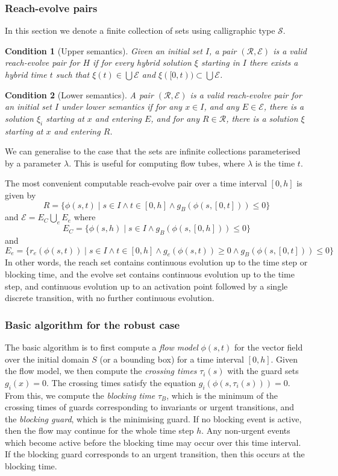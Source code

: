 \documentclass[english,a4paper]{article}
\theoremstyle{theorem}
\newtheorem*{condition*}{Condition}
\theoremstyle{definition}
\theoremstyle{remark}
\begin{document}
\subsubsection*{Reach-evolve pairs}

In this section we denote a finite collection of sets using calligraphic type $\mathcal{S}$.
\begin{condition*}[Upper semantics]
Given an initial set $I$, a pair $(\mathcal{R},\mathcal{E})$ is a valid reach-evolve pair for $H$ if for every hybrid solution $\xi$ starting in $I$ there exists a hybrid time $t$ such that $\xi(t)\in \bigcup\mathcal{E}$ and $\xi([0,t))\subset \bigcup\mathcal{E}$.
\end{condition*}

\begin{condition*}[Lower semantics]
A pair $(\mathcal{R},\mathcal{E})$ is a valid reach-evolve pair for an initial set $I$ under \emph{lower semantics} if for any $x\in I$, and any $E\in\mathcal{E}$, there is a solution $\xi_i$ starting at $x$ and entering $E$, and for any $R\in\mathcal{R}$, there is a solution $\xi$ starting at $x$ and entering $R$.
\end{condition*}
We can generalise to the case that the sets are infinite collections parameterised by a parameter $\lambda$. This is useful for computing flow tubes, where $\lambda$ is the time $t$.

The most convenient computable reach-evolve pair over a time interval $[0,h]$ is given by
\[ R=\{ \phi(s,t) \mid s\in I \wedge t\in[0,h] \wedge g_B(\phi(s,[0,t]))\leq 0\} \]
and $\mathcal{E}=E_C \bigcup_e E_e$ where
\[ E_C=\{ \phi(s,h) \mid s\in I \wedge g_B(\phi(s,[0,h]))\leq 0\} \]
and
\[ E_e=\{ r_e(\phi(s,t)) \mid s\in I \wedge t\in[0,h] \wedge g_e(\phi(s,t))\geq 0 \wedge g_B(\phi(s,[0,t]))\leq 0 \} \]
In other words, the reach set contains continuous evolution up to the time step or blocking time, and the evolve set contains continuous evolution up to the time step, and continuous evolution up to an activation point followed by a single discrete transition, with no further continuous evolution.


\subsubsection*{Basic algorithm for the robust case}
The basic algorithm is to first compute a \emph{flow model} $\phi(s,t)$ for the vector field over the initial domain $S$ (or a bounding box) for a time interval $[0,h]$. Given the flow model, we then compute the \emph{crossing times} $\tau_i(s)$ with the guard sets $g_i(x)=0$. The crossing times satisfy the equation $g_i(\phi(s,\tau_i(s)))=0$. From this, we compute the \emph{blocking time} $\tau_B$, which is the minimum of the crossing times of guards corresponding to invariants or urgent transitions, and the \emph{blocking guard}, which is the minimising guard. If no blocking event is active, then the flow may continue for the whole time step $h$. Any non-urgent events which become active before the blocking time may occur over this time interval. If the blocking guard corresponds to an urgent transition, then this occurs at the blocking time.
\end{document}
